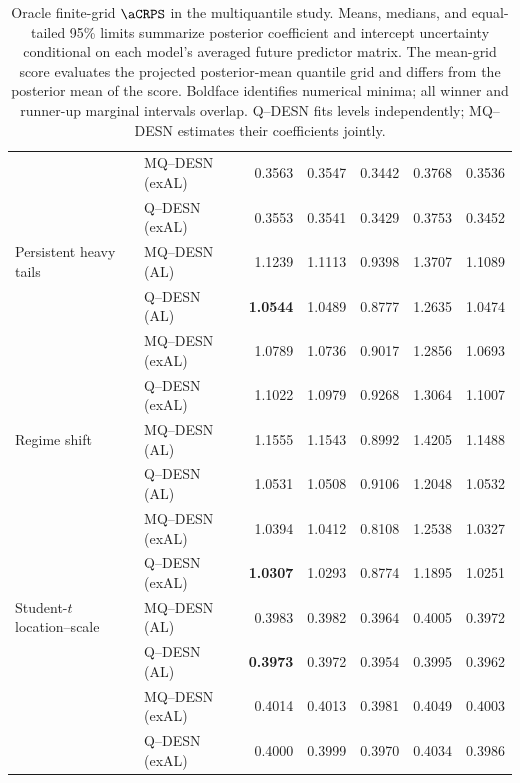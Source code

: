 \begin{table}[p]
\begin{tabular}{@{}>{\raggedright\arraybackslash}p{}>{\raggedright\arraybackslash}p{}rrrrr@{}}
 & MQ--DESN (exAL) & 0.3563 & 0.3547 & 0.3442 & 0.3768 & 0.3536 \\
 & Q--DESN (exAL) & 0.3553 & 0.3541 & 0.3429 & 0.3753 & 0.3452 \\
\addlinespace[2pt]
Persistent heavy tails & MQ--DESN (AL) & 1.1239 & 1.1113 & 0.9398 & 1.3707 & 1.1089 \\
 & Q--DESN (AL) & \textbf{1.0544} & 1.0489 & 0.8777 & 1.2635 & 1.0474 \\
 & MQ--DESN (exAL) & 1.0789 & 1.0736 & 0.9017 & 1.2856 & 1.0693 \\
 & Q--DESN (exAL) & 1.1022 & 1.0979 & 0.9268 & 1.3064 & 1.1007 \\
\addlinespace[2pt]
Regime shift & MQ--DESN (AL) & 1.1555 & 1.1543 & 0.8992 & 1.4205 & 1.1488 \\
 & Q--DESN (AL) & 1.0531 & 1.0508 & 0.9106 & 1.2048 & 1.0532 \\
 & MQ--DESN (exAL) & 1.0394 & 1.0412 & 0.8108 & 1.2538 & 1.0327 \\
 & Q--DESN (exAL) & \textbf{1.0307} & 1.0293 & 0.8774 & 1.1895 & 1.0251 \\
\addlinespace[2pt]
Student-\(t\) location--scale & MQ--DESN (AL) & 0.3983 & 0.3982 & 0.3964 & 0.4005 & 0.3972 \\
 & Q--DESN (AL) & \textbf{0.3973} & 0.3972 & 0.3954 & 0.3995 & 0.3962 \\
 & MQ--DESN (exAL) & 0.4014 & 0.4013 & 0.3981 & 0.4049 & 0.4003 \\
 & Q--DESN (exAL) & 0.4000 & 0.3999 & 0.3970 & 0.4034 & 0.3986 \\
\bottomrule
\end{tabular}
\caption{Oracle finite-grid \(\aCRPS\) in the multiquantile study. Means, medians, and equal-tailed 95\% limits summarize posterior coefficient and intercept uncertainty conditional on each model's averaged future predictor matrix. The mean-grid score evaluates the projected posterior-mean quantile grid and differs from the posterior mean of the score. Boldface identifies numerical minima; all winner and runner-up marginal intervals overlap. Q--DESN fits levels independently; MQ--DESN estimates their coefficients jointly.}
\label{tab:joint-qdesn-pure-desn-v2-score}
\end{table}
